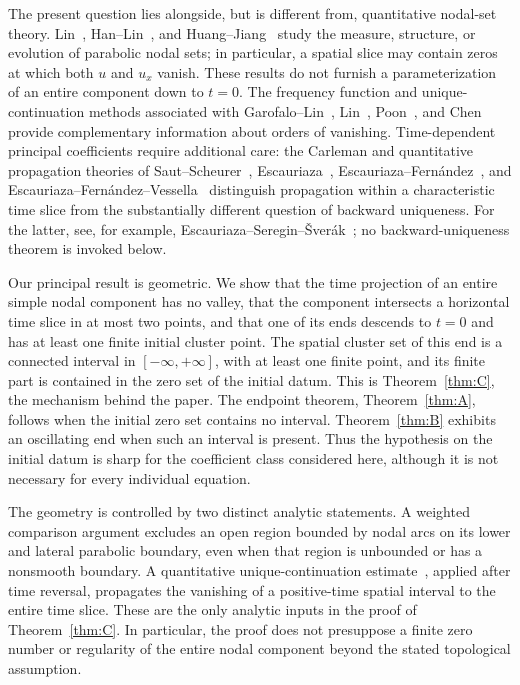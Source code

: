 \documentclass[11pt,reqno]{amsart}
\numberwithin{equation}{section}
\theoremstyle{definition}
\theoremstyle{remark}
\begin{document}
The present question lies alongside, but is different from, quantitative
nodal-set theory.  Lin~\cite{LinNodal}, Han--Lin~\cite{HanLin}, and
Huang--Jiang~\cite{HJ} study the measure, structure, or evolution of
parabolic nodal sets; in particular, a spatial slice may contain zeros
at which both $u$ and $u_x$ vanish.  These results do not furnish a
parameterization of an entire component down to $t=0$.  The frequency
function and unique-continuation methods associated with
Garofalo--Lin~\cite{GarofaloLin}, Lin~\cite{LinUnique},
Poon~\cite{Poon}, and Chen~\cite{Chen} provide complementary information
about orders of vanishing.  Time-dependent principal coefficients require
additional care: the Carleman and quantitative propagation theories of
Saut--Scheurer~\cite{SautScheurer}, Escauriaza~\cite{Escauriaza},
Escauriaza--Fern\'andez~\cite{EscauriazaFernandez}, and
Escauriaza--Fern\'andez--Vessella~\cite{EFV} distinguish propagation
within a characteristic time slice from the substantially different
question of backward uniqueness.  For the latter, see, for example,
Escauriaza--Seregin--\v Sver\'ak~\cite{ESS}; no backward-uniqueness
theorem is invoked below.

Our principal result is geometric.  We show that the time projection of
an entire simple nodal component has no valley, that the component
intersects a horizontal time slice in at most two points, and that one
of its ends descends to $t=0$ and has at least one finite
initial cluster point.  The spatial cluster set of this end is a connected interval
in $[-\infty,+\infty]$, with at least one finite point, and its finite
part is contained in the zero set of the initial datum.  This is
Theorem~\ref{thm:C}, the mechanism behind the paper.  The endpoint
theorem, Theorem~\ref{thm:A}, follows when the initial zero set contains
no interval.  Theorem~\ref{thm:B} exhibits an oscillating end when such
an interval is present.  Thus the hypothesis on the initial datum is
sharp for the coefficient class considered here, although it is not
necessary for every individual equation.

The geometry is controlled by two distinct analytic statements.  A
weighted comparison argument excludes an open region bounded by nodal
arcs on its lower and lateral parabolic boundary, even when that region
is unbounded or has a nonsmooth boundary.  A quantitative
unique-continuation estimate~\cite[Theorem~2(2)]{EFV}, applied after
time reversal, propagates the vanishing of a positive-time spatial
interval to the entire time slice.  These are the only analytic inputs
in the proof of Theorem~\ref{thm:C}.  In particular, the proof does not
presuppose a finite zero number or regularity of the entire nodal
component beyond the stated topological assumption.
\end{document}
